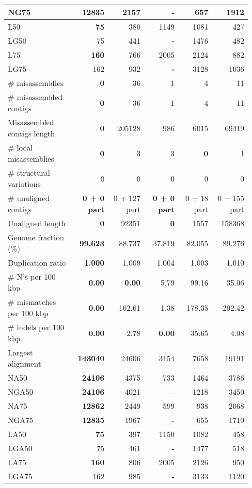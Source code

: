 \documentclass[12pt,a4paper]{article}
\begin{document}
\begin{table}[ht]
\begin{center}
\begin{tabular}{|l*{5}{|r}|}
NG75 & {\bf 12835} & 2157 & - & 657 & 1912 \\ \hline
L50 & {\bf 75} & 380 & 1149 & 1081 & 427 \\ \hline
LG50 & 75 & 441 & {\bf -} & 1476 & 482 \\ \hline
L75 & {\bf 160} & 766 & 2005 & 2124 & 882 \\ \hline
LG75 & 162 & 932 & {\bf -} & 3128 & 1036 \\ \hline
\# misassemblies & {\bf 0} & 36 & 1 & 4 & 11 \\ \hline
\# misassembled contigs & {\bf 0} & 36 & 1 & 4 & 11 \\ \hline
Misassembled contigs length & {\bf 0} & 205128 & 986 & 6015 & 69419 \\ \hline
\# local misassemblies & {\bf 0} & 3 & 3 & {\bf 0} & 1 \\ \hline
\# structural variations & 0 & 0 & 0 & 0 & 0 \\ \hline
\# unaligned contigs & {\bf 0 + 0 part} & 0 + 127 part & {\bf 0 + 0 part} & 0 + 18 part & 0 + 155 part \\ \hline
Unaligned length & {\bf 0} & 92351 & {\bf 0} & 1557 & 158368 \\ \hline
Genome fraction (\%) & {\bf 99.623} & 88.737 & 37.819 & 82.055 & 89.276 \\ \hline
Duplication ratio & {\bf 1.000} & 1.009 & 1.004 & 1.003 & 1.010 \\ \hline
\# N's per 100 kbp & {\bf 0.00} & {\bf 0.00} & 5.79 & 99.16 & 35.06 \\ \hline
\# mismatches per 100 kbp & {\bf 0.00} & 102.61 & 1.38 & 178.35 & 292.42 \\ \hline
\# indels per 100 kbp & {\bf 0.00} & 2.78 & {\bf 0.00} & 35.65 & 4.08 \\ \hline
Largest alignment & {\bf 143040} & 24606 & 3154 & 7658 & 19191 \\ \hline
NA50 & {\bf 24106} & 4375 & 733 & 1464 & 3786 \\ \hline
NGA50 & {\bf 24106} & 4021 & - & 1218 & 3450 \\ \hline
NA75 & {\bf 12862} & 2449 & 599 & 938 & 2068 \\ \hline
NGA75 & {\bf 12835} & 1967 & - & 655 & 1710 \\ \hline
LA50 & {\bf 75} & 397 & 1150 & 1082 & 458 \\ \hline
LGA50 & 75 & 461 & {\bf -} & 1477 & 518 \\ \hline
LA75 & {\bf 160} & 806 & 2005 & 2126 & 950 \\ \hline
LGA75 & 162 & 985 & {\bf -} & 3133 & 1120 \\ \hline
\end{tabular}
\end{center}
\end{table}
\end{document}
